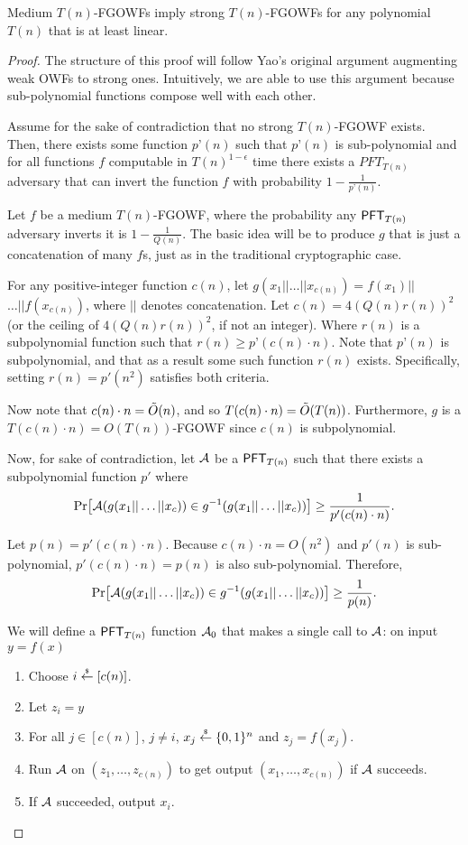 \begin{claim}\label{clm:medium-strong-owf}
	Medium $T(n)$-FGOWFs imply strong $T(n)$-FGOWFs for any polynomial $T(n)$ that is at least linear.
\end{claim}
\begin{proof}
	The structure of this proof will follow Yao's original argument augmenting weak OWFs to strong ones. Intuitively, we are able to use this argument because sub-polynomial functions compose well with each other.
	
	Assume for the sake of contradiction that no strong $T(n)$-FGOWF exists. Then, there exists some function $p’(n)$ such that $p’(n)$ is sub-polynomial and for all functions $f$ computable in $T(n)^{1-\epsilon}$ time there exists a $PFT_{T(n)}$ adversary that can invert the function $f$ with probability $1-\frac{1}{p’(n)}$.
	
	Let $f$ be a medium $T(n)$-FGOWF, where the probability any $\PFT{T(n)}$ adversary inverts it is $1 - \frac 1 {Q(n)}$. The basic idea will be to produce $g$ that is just a concatenation of many $f$s, just as in the traditional cryptographic case.
	
	For any positive-integer function $c(n)$, let $g(x_1 || \dots || x_{c(n)}) = f(x_1)||$ $\dots ||f(x_{c(n)})$, where $||$ denotes concatenation.
	Let $c(n) = 4 \left( Q(n)r(n) \right)^2$ (or the ceiling of $4 \left( Q(n)r(n) \right)^2$, if not an integer). 	Where $r(n)$ is a subpolynomial function such that $r(n) \ge p’(c(n) \cdot n)$. Note that $p’(n)$ is subpolynomial, and that as a result some such function $r(n)$ exists. Specifically, setting $r(n) = p'(n^2)$ satisfies both criteria.
	
	Now note that $c(n) \cdot n = \~O(n)$, and so $T(c(n) \cdot n) = \~O(T(n))$. Furthermore, $g$ is a $T(c(n) \cdot n) = O(T(n))$-FGOWF since $c(n)$ is subpolynomial.
	
	Now, for sake of contradiction, let $\cA$ be a $\PFT{T(n)}$ such that there exists a subpolynomial function $p'$ where
	\[\Pr\bigl[\cA(g(x_1 || \dots || x_c)) \in g^{-1}(g(x_1 || \dots || x_c))\bigr] \ge \frac 1 {p'(c(n) \cdot n)}.\]
	
	
	Let $p(n) = p'(c(n) \cdot n)$. Because $c(n)\cdot n = O(n^2)$ and $p'(n)$ is sub-polynomial, $p'(c(n) \cdot n) = p(n)$ is also sub-polynomial. Therefore,
	\[\Pr\bigl[\cA(g(x_1 || \dots || x_c)) \in g^{-1}(g(x_1 || \dots || x_c))\bigr] \ge \frac 1 {p(n)}.\]

	We will define a $\PFT{T(n)}$ function $\cA_0$ that makes a single call to $\cA$: on input $y = f(x)$
	\begin{enumerate}
		\item Choose $i \getsr [c(n)]$.
		\item Let $z_i = y$
		\item For all $j \in [c(n)]$, $j \neq i$, $x_j \getsr \{0,1\}^n$ and $z_j = f(x_j)$.
		\item Run $\cA$ on $(z_1, \dots, z_{c(n)})$ to get output $(x_1, \dots, x_{c(n)})$ if $\cA$ succeeds.
		\item If $\cA$ succeeded, output $x_i$.
	\end{enumerate}
	

\end{proof}
